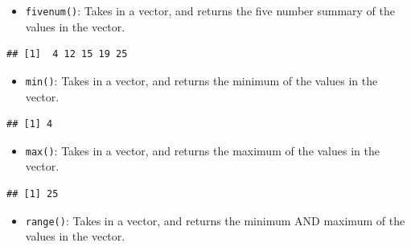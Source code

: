 \documentclass[
]{book}
\newenvironment{Shaded}{\begin{snugshade}}{\end{snugshade}}
\newcommand{\KeywordTok}[1]{\textcolor[rgb]{0.13,0.29,0.53}{\textbf{#1}}}
\newcommand{\NormalTok}[1]{#1}
\newcommand{\OperatorTok}[1]{\textcolor[rgb]{0.81,0.36,0.00}{\textbf{#1}}}
\providecommand{\tightlist}{%
  \setlength{\itemsep}{0pt}\setlength{\parskip}{0pt}}
\begin{document}
\begin{itemize}
\tightlist
\item
  \texttt{fivenum()}: Takes in a vector, and returns the five number summary of the values in the vector.
\end{itemize}

\begin{Shaded}
\end{Shaded}

\begin{verbatim}
## [1]  4 12 15 19 25
\end{verbatim}

\begin{itemize}
\tightlist
\item
  \texttt{min()}: Takes in a vector, and returns the minimum of the values in the vector.
\end{itemize}

\begin{Shaded}
\end{Shaded}

\begin{verbatim}
## [1] 4
\end{verbatim}

\begin{itemize}
\tightlist
\item
  \texttt{max()}: Takes in a vector, and returns the maximum of the values in the vector.
\end{itemize}

\begin{Shaded}
\end{Shaded}

\begin{verbatim}
## [1] 25
\end{verbatim}

\begin{itemize}
\tightlist
\item
  \texttt{range()}: Takes in a vector, and returns the minimum AND maximum of the values in the vector.
\end{itemize}
\end{document}

